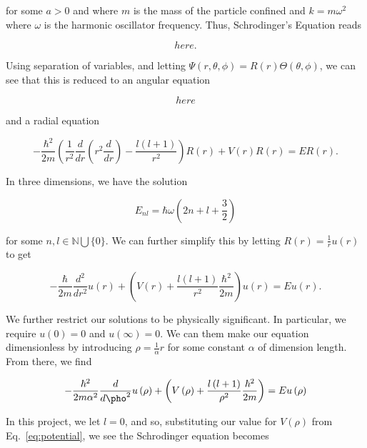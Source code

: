 \documentclass[12pt]{article}
\numberwithin{equation}{section}
\begin{document}
\noindent for some $a>0$ and where $m$ is the mass of the particle confined and $k=m\omega^{2}$ where $\omega$ is the harmonic oscillator frequency.  Thus, Schrodinger's Equation reads

\begin{equation}
\label{eq:schrodpart1}
here.
\end{equation}

\noindent Using separation of variables, and letting $\Psi\left(r,\theta,\phi\right)=R\left(r\right)\Theta\left(\theta,\phi\right)$, we can see that this is reduced to an angular equation

\begin{equation}
\label{eq:schrodang}
here
\end{equation}

\noindent and a radial equation

\begin{equation}
\label{eq:schrodrad}
-\frac{\hbar^{2}}{2m}\left(\frac{1}{r^{2}}\frac{d}{dr}\left(r^{2}\frac{d}{dr}\right)-\frac{l\left(l+1\right)}{r^{2}}\right)R\left(r\right)+V\left(r\right)R\left(r\right)=ER\left(r\right).
\end{equation}

\noindent In three dimensions, we have the solution

\begin{equation}
\label{eq:schrodsol}
E_{nl}=\hbar\omega\left(2n+l+\frac{3}{2}\right)
\end{equation}

\noindent for some $n,l\in\mathbb{N}\bigcup\{0\}$.  We can further simplify this by letting $R\left(r\right)=\frac{1}{r}u\left(r\right)$ to get

$$-\frac{\hbar}{2m}\frac{d^{2}}{dr^{2}}u\left(r\right)+\left(V\left(r\right)+\frac{l\left(l+1\right)}{r^{2}}\frac{\hbar^{2}}{2m}\right)u\left(r\right)=Eu\left(r\right).$$

\noindent We further restrict our solutions to be physically significant.  In particular, we require $u\left(0\right)=0$ and $u\left(\infty\right)=0$.  We can them make our equation dimensionless by introducing $\rho=\frac{1}{\alpha}r$ for some constant $\alpha$ of dimension length.  From there, we find

$$-\frac{\hbar^{2}}{2m\alpha^{2}}\frac{d}{d\pho^2}u\left(\rho\right)+\left(V\left(\rho\right)+\frac{l\left(l+1\right)}{\rho^{2}}\frac{\hbar^{2}}{2m}\right)=Eu\left(\rho\right)$$

\noindent In this project, we let $l=0$, and so, substituting our value for $V\left(\rho\right)$ from Eq.~\ref{eq:potential}, we see the Schrodinger equation becomes
\end{document}
